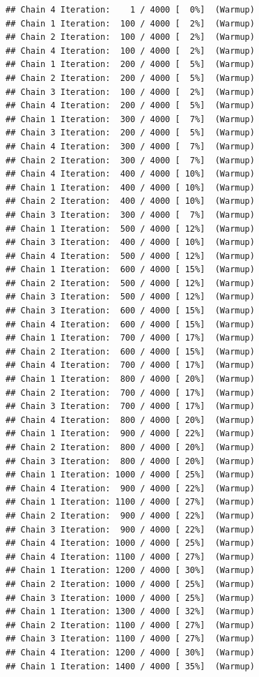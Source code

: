 \documentclass[
]{article}
\begin{document}
\begin{verbatim}
## Chain 4 Iteration:    1 / 4000 [  0%]  (Warmup) 
## Chain 1 Iteration:  100 / 4000 [  2%]  (Warmup) 
## Chain 2 Iteration:  100 / 4000 [  2%]  (Warmup) 
## Chain 4 Iteration:  100 / 4000 [  2%]  (Warmup) 
## Chain 1 Iteration:  200 / 4000 [  5%]  (Warmup) 
## Chain 2 Iteration:  200 / 4000 [  5%]  (Warmup) 
## Chain 3 Iteration:  100 / 4000 [  2%]  (Warmup) 
## Chain 4 Iteration:  200 / 4000 [  5%]  (Warmup) 
## Chain 1 Iteration:  300 / 4000 [  7%]  (Warmup) 
## Chain 3 Iteration:  200 / 4000 [  5%]  (Warmup) 
## Chain 4 Iteration:  300 / 4000 [  7%]  (Warmup) 
## Chain 2 Iteration:  300 / 4000 [  7%]  (Warmup) 
## Chain 4 Iteration:  400 / 4000 [ 10%]  (Warmup) 
## Chain 1 Iteration:  400 / 4000 [ 10%]  (Warmup) 
## Chain 2 Iteration:  400 / 4000 [ 10%]  (Warmup) 
## Chain 3 Iteration:  300 / 4000 [  7%]  (Warmup) 
## Chain 1 Iteration:  500 / 4000 [ 12%]  (Warmup) 
## Chain 3 Iteration:  400 / 4000 [ 10%]  (Warmup) 
## Chain 4 Iteration:  500 / 4000 [ 12%]  (Warmup) 
## Chain 1 Iteration:  600 / 4000 [ 15%]  (Warmup) 
## Chain 2 Iteration:  500 / 4000 [ 12%]  (Warmup) 
## Chain 3 Iteration:  500 / 4000 [ 12%]  (Warmup) 
## Chain 3 Iteration:  600 / 4000 [ 15%]  (Warmup) 
## Chain 4 Iteration:  600 / 4000 [ 15%]  (Warmup) 
## Chain 1 Iteration:  700 / 4000 [ 17%]  (Warmup) 
## Chain 2 Iteration:  600 / 4000 [ 15%]  (Warmup) 
## Chain 4 Iteration:  700 / 4000 [ 17%]  (Warmup) 
## Chain 1 Iteration:  800 / 4000 [ 20%]  (Warmup) 
## Chain 2 Iteration:  700 / 4000 [ 17%]  (Warmup) 
## Chain 3 Iteration:  700 / 4000 [ 17%]  (Warmup) 
## Chain 4 Iteration:  800 / 4000 [ 20%]  (Warmup) 
## Chain 1 Iteration:  900 / 4000 [ 22%]  (Warmup) 
## Chain 2 Iteration:  800 / 4000 [ 20%]  (Warmup) 
## Chain 3 Iteration:  800 / 4000 [ 20%]  (Warmup) 
## Chain 1 Iteration: 1000 / 4000 [ 25%]  (Warmup) 
## Chain 4 Iteration:  900 / 4000 [ 22%]  (Warmup) 
## Chain 1 Iteration: 1100 / 4000 [ 27%]  (Warmup) 
## Chain 2 Iteration:  900 / 4000 [ 22%]  (Warmup) 
## Chain 3 Iteration:  900 / 4000 [ 22%]  (Warmup) 
## Chain 4 Iteration: 1000 / 4000 [ 25%]  (Warmup) 
## Chain 4 Iteration: 1100 / 4000 [ 27%]  (Warmup) 
## Chain 1 Iteration: 1200 / 4000 [ 30%]  (Warmup) 
## Chain 2 Iteration: 1000 / 4000 [ 25%]  (Warmup) 
## Chain 3 Iteration: 1000 / 4000 [ 25%]  (Warmup) 
## Chain 1 Iteration: 1300 / 4000 [ 32%]  (Warmup) 
## Chain 2 Iteration: 1100 / 4000 [ 27%]  (Warmup) 
## Chain 3 Iteration: 1100 / 4000 [ 27%]  (Warmup) 
## Chain 4 Iteration: 1200 / 4000 [ 30%]  (Warmup) 
## Chain 1 Iteration: 1400 / 4000 [ 35%]  (Warmup) 

\end{verbatim}
\end{document}
